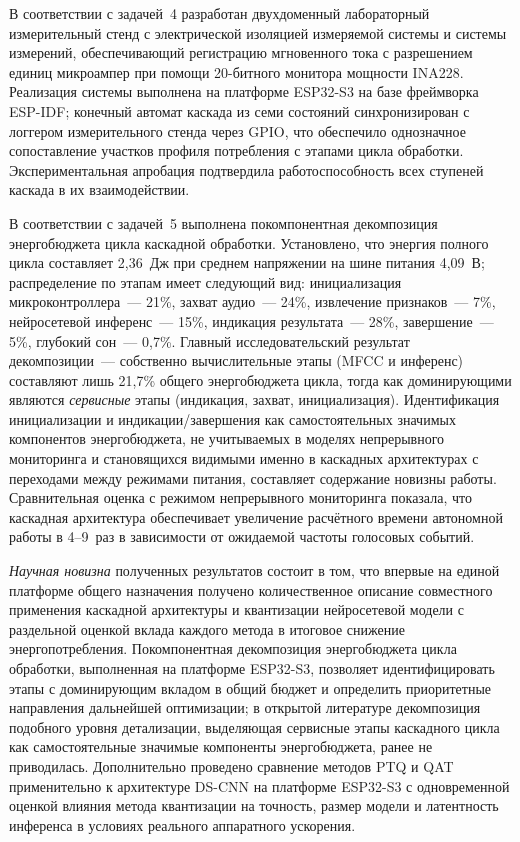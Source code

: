 В соответствии с задачей~4 разработан двухдоменный лабораторный
измерительный стенд с электрической изоляцией измеряемой системы и
системы измерений, обеспечивающий регистрацию мгновенного тока с
разрешением единиц микроампер при помощи 20-битного монитора мощности
INA228. Реализация системы выполнена на платформе ESP32-S3 на базе
фреймворка ESP-IDF; конечный автомат каскада из семи состояний
синхронизирован с логгером измерительного стенда через GPIO, что
обеспечило однозначное сопоставление участков профиля потребления с
этапами цикла обработки. Экспериментальная апробация подтвердила
работоспособность всех ступеней каскада в их взаимодействии.

В соответствии с задачей~5 выполнена покомпонентная декомпозиция
энергобюджета цикла каскадной обработки. Установлено, что энергия
полного цикла составляет 2,36~Дж при среднем напряжении на шине
питания 4,09~В; распределение по этапам имеет следующий
вид: инициализация микроконтроллера~--- 21\%, захват аудио~---
24\%, извлечение признаков~--- 7\%, нейросетевой инференс~--- 15\%,
индикация результата~--- 28\%, завершение~--- 5\%, глубокий
сон~--- 0,7\%. Главный исследовательский результат
декомпозиции~--- собственно вычислительные этапы (MFCC и инференс)
составляют лишь 21,7\% общего энергобюджета цикла, тогда как
доминирующими являются \textit{сервисные} этапы (индикация,
захват, инициализация). Идентификация инициализации и
индикации/завершения как самостоятельных значимых компонентов
энергобюджета, не учитываемых в моделях непрерывного мониторинга и
становящихся видимыми именно в каскадных архитектурах с переходами
между режимами питания, составляет содержание новизны работы.
Сравнительная оценка с режимом непрерывного мониторинга показала,
что каскадная архитектура обеспечивает увеличение расчётного
времени автономной работы в 4--9~раз в зависимости от ожидаемой
частоты голосовых событий.

\textit{Научная новизна} полученных результатов состоит в том, что
впервые на единой платформе общего назначения получено количественное
описание совместного применения каскадной архитектуры и квантизации
нейросетевой модели с раздельной оценкой вклада каждого метода в
итоговое снижение энергопотребления. Покомпонентная декомпозиция
энергобюджета цикла обработки, выполненная на платформе ESP32-S3,
позволяет идентифицировать этапы с доминирующим вкладом в общий
бюджет и определить приоритетные направления дальнейшей оптимизации;
в открытой литературе декомпозиция подобного уровня детализации,
выделяющая сервисные этапы каскадного цикла как самостоятельные
значимые компоненты энергобюджета, ранее не приводилась.
Дополнительно проведено сравнение методов PTQ и QAT применительно к
архитектуре DS-CNN на платформе ESP32-S3 с одновременной оценкой
влияния метода квантизации на точность, размер модели и латентность
инференса в условиях реального аппаратного ускорения.

